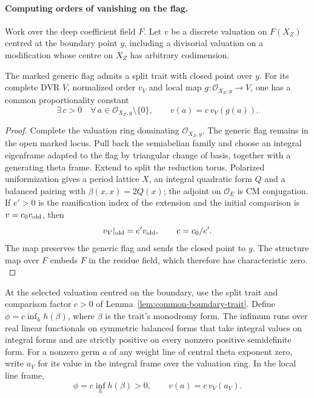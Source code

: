 \paragraph{Computing orders of vanishing on the flag.}
Work over the deep coefficient field \(F\). Let \(v\) be a
discrete valuation on \(F(X_Z)\) centred at the boundary point
\(y\), including a divisorial valuation on a modification whose
centre on \(X_Z\) has arbitrary codimension.

\begin{lemma}\label{lem:common-boundary-trait}
The marked generic flag admits a split trait with closed point
over \(y\). For its complete DVR \(V\), normalized order \(v_V\)
and local map \(g:\mathcal O_{X_Z,y}\to V\), one has a common proportionality constant
\[
 \exists\,c>0\quad \forall\,a\in\mathcal O_{X_Z,y}\setminus\{0\},\qquad v(a)=c\,v_V(g(a)).
\]

\end{lemma}
\begin{proof}
Complete the valuation ring dominating \(\mathcal O_{X_Z,y}\).
The generic flag remains in the open marked locus. Pull back the
semiabelian family and choose an integral eigenframe adapted to
the flag by triangular change of basis, together with a generating
theta frame. Extend to split the reduction torus. Polarized
uniformization gives a period lattice \(X\), an integral quadratic
form \(Q\) and a balanced pairing with \(\beta(x,x)=2Q(x)\);
the adjoint on \(\mathcal O_E\) is CM conjugation. If \(e'>0\)
is the ramification index of the extension and the initial
comparison is \(v=c_0v_{\rm old}\), then
\[
             v_V|_{\rm old}=e'v_{\rm old},\qquad c=c_0/e' .
\]
The map preserves the generic flag and sends the closed point
to \(y\). The structure map over \(F\) embeds \(F\) in the
residue field, which therefore has characteristic zero.
\label{cor:deep-boundary-orders-1}
\end{proof}

\begin{lemma}\label{lem:deep-trait-frame-order}
At the selected valuation centred on the boundary, use the
split trait and comparison factor \(c>0\) of Lemma~\ref{lem:common-boundary-trait}. Define \(\phi=c\inf_h h(\beta)\), where \(\beta\) is the
trait's monodromy form. The infimum runs over real linear functionals
on symmetric balanced forms that take integral values on integral
forms and are strictly positive on every nonzero positive semidefinite
form. For a nonzero germ \(a\) of any weight line of central theta exponent zero, write \(a_V\) for its value in the integral frame over the valuation ring. In the local line frame,
\[
 \phi=c\inf_h h(\beta)>0,\qquad v(a)=c\,v_V(a_V).
\]

\end{lemma}

